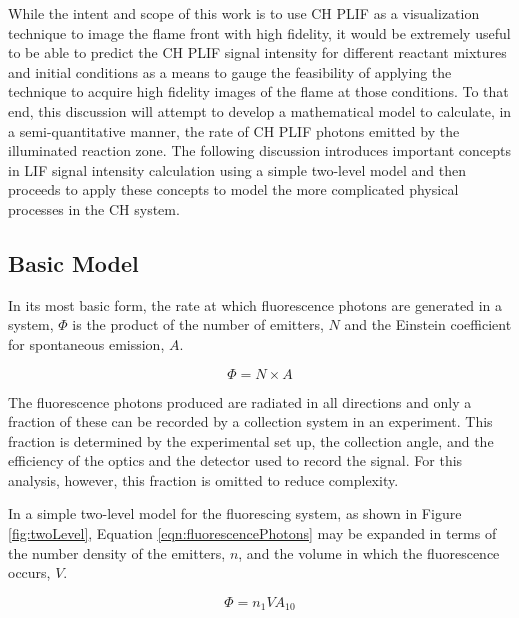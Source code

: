 While the intent and scope of this work is to use CH PLIF as a visualization technique to image the flame front with high fidelity, it would be extremely useful to be able to predict the CH PLIF signal intensity for different reactant mixtures and initial conditions as a means to gauge the feasibility of applying the technique to acquire high fidelity images of the flame at those conditions.
To that end, this discussion will attempt to develop a mathematical model to calculate, in a semi-quantitative manner, the rate of CH PLIF photons emitted by the illuminated reaction zone.
The following discussion introduces important concepts in LIF signal intensity calculation using a simple two-level model and then proceeds to apply these concepts to model the more complicated physical processes in the CH system.

\subsection{Basic Model}
\label{subsec:chplif-basic-model}

In its most basic form, the rate at which fluorescence photons are generated in a system, \(\Phi\) is the product of the number of emitters, \(N\) and the Einstein coefficient for spontaneous emission, \(A\).

\begin{equation}
  \Phi = N\times A
  \label{eqn:fluorescencePhotons}
\end{equation}

The fluorescence photons produced are radiated in all directions and only a fraction of these can be recorded by a collection system in an experiment.
This fraction is determined by the experimental set up, the collection angle, and the efficiency of the optics and the detector used to record the signal.
For this analysis, however, this fraction is omitted to reduce complexity.



In a simple two-level model for the fluorescing system, as shown in Figure \ref{fig:twoLevel}, Equation \ref{eqn:fluorescencePhotons} may be expanded in terms of the number density of the emitters, \(n\), and the volume in which the fluorescence occurs, \(V\).

\begin{equation}
  \Phi = n_1VA_{10}
\end{equation}

